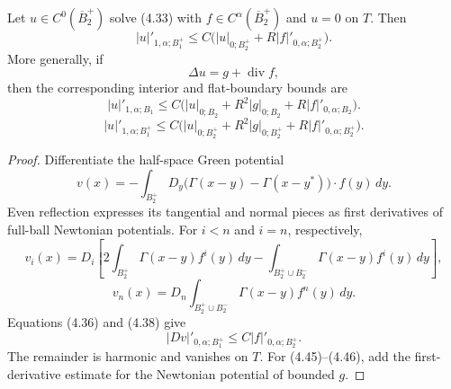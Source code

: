 \begin{theorem}\label{gt:thm-poisson-first-derivative-halfball}
Let $u\in C^0(\overline B_2^+)$ solve (4.33) with
$f\in C^\alpha(\overline B_2^+)$ and $u=0$ on $T$. Then
\begin{equation}
\tag{4.43}
|u|'_{1,\alpha;B_1^+}
\leq C\bigl(|u|_{0;B_2^+}+R|f|'_{0,\alpha;B_2^+}\bigr).
\end{equation}
More generally, if
\begin{equation}
\tag{4.44}
\Delta u=g+\operatorname{div}f,
\end{equation}
then the corresponding interior and flat-boundary bounds are
\begin{equation}
\tag{4.45}
|u|'_{1,\alpha;B_1}
\leq C\bigl(|u|_{0;B_2}+R^2|g|_{0;B_2}
+R|f|'_{0,\alpha;B_2}\bigr).
\end{equation}
\begin{equation}
\tag{4.46}
|u|'_{1,\alpha;B_1^+}
\leq C\bigl(|u|_{0;B_2^+}+R^2|g|_{0;B_2^+}
+R|f|'_{0,\alpha;B_2^+}\bigr).
\end{equation}
\end{theorem}
\begin{proof}
\sketch Differentiate the half-space Green potential
\begin{equation}
\tag{4.39}
v(x)=-\int_{B_2^+}D_y
\bigl(\Gamma(x-y)-\Gamma(x-y^*)\bigr)\mathbin{\cdot}f(y)\,dy.
\end{equation}
Even reflection expresses its tangential and normal pieces as first
derivatives of full-ball Newtonian potentials. For $i<n$ and $i=n$,
respectively,
\begin{equation}
\tag{4.40}
v_i(x)=D_i\left[2\int_{B_2^+}\Gamma(x-y)f^i(y)\,dy
-\int_{B_2^+\cup B_2^-}\Gamma(x-y)f^i(y)\,dy\right],
\end{equation}
\begin{equation}
\tag{4.41}
v_n(x)=D_n\int_{B_2^+\cup B_2^-}\Gamma(x-y)f^n(y)\,dy.
\end{equation}
Equations (4.36) and (4.38) give
\begin{equation}
\tag{4.42}
|Dv|'_{0,\alpha;B_1^+}\leq C|f|'_{0,\alpha;B_2^+}.
\end{equation}
The remainder is
harmonic and vanishes on $T$. For (4.45)--(4.46), add the first-derivative
estimate for the Newtonian potential of bounded $g$.
\end{proof}
